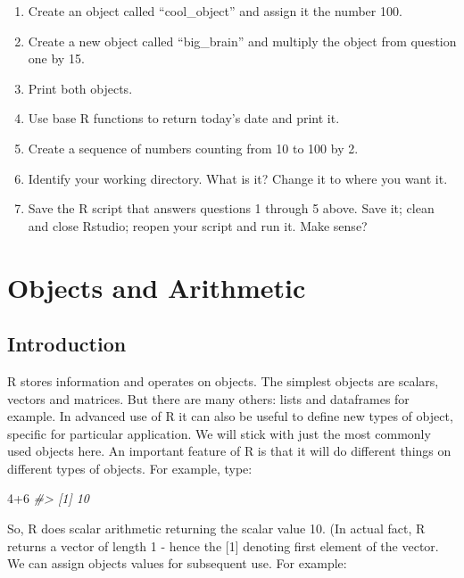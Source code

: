 \documentclass[
]{book}
\newenvironment{Shaded}{\begin{snugshade}}{\end{snugshade}}
\newcommand{\CommentTok}[1]{\textcolor[rgb]{0.56,0.35,0.01}{\textit{#1}}}
\newcommand{\DecValTok}[1]{\textcolor[rgb]{0.00,0.00,0.81}{#1}}
\newcommand{\SpecialCharTok}[1]{\textcolor[rgb]{0.00,0.00,0.00}{#1}}
\begin{document}
\begin{enumerate}
\def\labelenumi{\arabic{enumi}.}
\item
  Create an object called ``cool\_object'' and assign it the number 100.
\item
  Create a new object called ``big\_brain'' and multiply the object from question one by 15.
\item
  Print both objects.
\item
  Use base R functions to return today's date and print it.
\item
  Create a sequence of numbers counting from 10 to 100 by 2.
\item
  Identify your working directory. What is it? Change it to where you want it.
\item
  Save the R script that answers questions 1 through 5 above. Save it; clean and close Rstudio; reopen your script and run it. Make sense?
\end{enumerate}

\hypertarget{objects-and-arithmetic}{%
\chapter{Objects and Arithmetic}\label{objects-and-arithmetic}}

\hypertarget{introduction-1}{%
\section{Introduction}\label{introduction-1}}

R stores information and operates on objects. The simplest objects are scalars, vectors and matrices.
But there are many others: lists and dataframes for example. In advanced use of R it can also be
useful to define new types of object, specific for particular application. We will stick with just the
most commonly used objects here.
An important feature of R is that it will do different things on different types of objects. For
example, type:

\begin{Shaded}
\begin{Highlighting}[]
\DecValTok{4}\SpecialCharTok{+}\DecValTok{6}
\CommentTok{\#\textgreater{} [1] 10}
\end{Highlighting}
\end{Shaded}

So, R does scalar arithmetic returning the scalar value 10. (In actual fact, R returns a vector of
length 1 - hence the {[}1{]} denoting first element of the vector.
We can assign objects values for subsequent use. For example:
\end{document}
